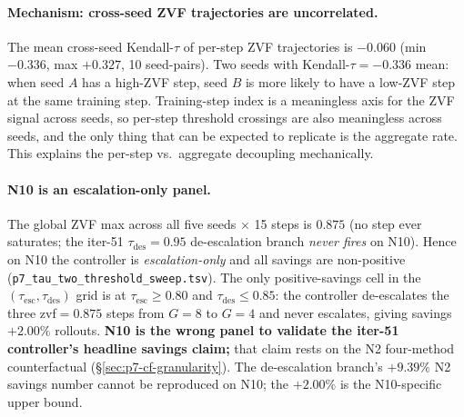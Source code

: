 \documentclass{article}
\begin{document}
\paragraph{Mechanism: cross-seed ZVF trajectories are
uncorrelated.}
The mean cross-seed Kendall-$\tau$ of per-step ZVF
trajectories is $-0.060$ (min $-0.336$, max $+0.327$, 10
seed-pairs).  Two seeds with Kendall-$\tau = -0.336$ mean:
when seed $A$ has a high-ZVF step, seed $B$ is more likely
to have a low-ZVF step at the same training step.
Training-step index is a meaningless axis for the ZVF
signal across seeds, so per-step threshold crossings are
also meaningless across seeds, and the only thing that
can be expected to replicate is the aggregate rate.
This explains the per-step vs.\ aggregate decoupling
mechanically.

\paragraph{N10 is an escalation-only panel.}
The global ZVF max across all five seeds $\times$ 15 steps
is $0.875$ (no step ever saturates; the iter-51
$\tau_{\mathrm{des}}{=}0.95$ de-escalation branch \emph{never
fires} on N10).  Hence on N10 the controller is
\emph{escalation-only} and all savings are non-positive
(\texttt{p7\_tau\_two\_threshold\_sweep.tsv}).  The only
positive-savings cell in the $(\tau_{\mathrm{esc}},
\tau_{\mathrm{des}})$ grid is at
$\tau_{\mathrm{esc}} \geq 0.80$ and $\tau_{\mathrm{des}}
\leq 0.85$: the controller de-escalates the three
zvf${=}0.875$ steps from $G{=}8$ to $G{=}4$ and never
escalates, giving savings $\mathbf{+2.00\%}$ rollouts.
\textbf{N10 is the wrong panel to validate the iter-51
controller's headline savings claim;} that claim rests
on the N2 four-method counterfactual
(\S\ref{sec:p7-cf-granularity}).  The de-escalation
branch's $+9.39\%$ N2 savings number cannot be reproduced
on N10; the $+2.00\%$ is the N10-specific upper bound.
\end{document}
